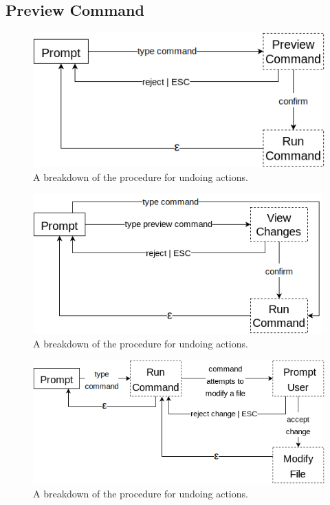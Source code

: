\subsection{Preview Command}

\begin{figure}[H]
  \centering
  \includegraphics[width=0.8\linewidth]{figures/alternatives/preview_a.png}
  \caption{A breakdown of the procedure for undoing actions.}
  \label{fig:undoa}
\end{figure}

\begin{figure}[H]
  \centering
  \includegraphics[width=0.8\linewidth]{figures/alternatives/preview_b.png}
  \caption{A breakdown of the procedure for undoing actions.}
  \label{fig:undob}
\end{figure}

\begin{figure}[H]
  \centering
  \includegraphics[width=0.8\linewidth]{figures/alternatives/preview_c.png}
  \caption{A breakdown of the procedure for undoing actions.}
  \label{fig:undoc}
\end{figure}
